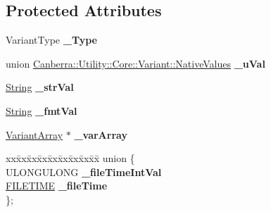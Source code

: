 \subsection*{Protected Attributes}
\begin{DoxyCompactItemize}
\item 
\mbox{\label{class_canberra_1_1_utility_1_1_core_1_1_variant_a07619f2eb3f32affc12daf6a40bb65fd}} 
Variant\+Type {\bfseries \+\_\+\+Type}
\item 
\mbox{\label{class_canberra_1_1_utility_1_1_core_1_1_variant_a03734c31788409ed8ef95af1a1df2de6}} 
union \hyperlink{class_canberra_1_1_utility_1_1_core_1_1_variant_de/db0/union_canberra_1_1_utility_1_1_core_1_1_variant_1_1_native_values}{Canberra\+::\+Utility\+::\+Core\+::\+Variant\+::\+Native\+Values} {\bfseries \+\_\+u\+Val}
\item 
\mbox{\label{class_canberra_1_1_utility_1_1_core_1_1_variant_a8b165057cccc80756fe893012aa55e6f}} 
\hyperlink{class_canberra_1_1_utility_1_1_core_1_1_string}{String} {\bfseries \+\_\+str\+Val}
\item 
\mbox{\label{class_canberra_1_1_utility_1_1_core_1_1_variant_a972467988919ff60c3d4d5f8c099a84b}} 
\hyperlink{class_canberra_1_1_utility_1_1_core_1_1_string}{String} {\bfseries \+\_\+fmt\+Val}
\item 
\mbox{\label{class_canberra_1_1_utility_1_1_core_1_1_variant_a6324443248ee6284297a384385d31ee7}} 
\hyperlink{class_canberra_1_1_utility_1_1_core_1_1_variant_array}{Variant\+Array} $\ast$ {\bfseries \+\_\+var\+Array}
\item 
\mbox{\label{class_canberra_1_1_utility_1_1_core_1_1_variant_a4c83597850d0f70101e2161b9968a5c7}} 
\begin{tabbing}
xx\=xx\=xx\=xx\=xx\=xx\=xx\=xx\=xx\=\kill
union \{\\
\mbox{\label{class_canberra_1_1_utility_1_1_core_1_1_variant_a2686648656aa9c5e42c80adcb2dee109}} 
ULONGULONG {\bfseries \_fileTimeIntVal}\\
\mbox{\label{class_canberra_1_1_utility_1_1_core_1_1_variant_a92a05cf872c016c01c41eb1a94e85af8}} 
\hyperlink{struct___f_i_l_e_t_i_m_e}{FILETIME} {\bfseries \_fileTime}\\
\}; \\

\end{tabbing}\end{DoxyCompactItemize}


